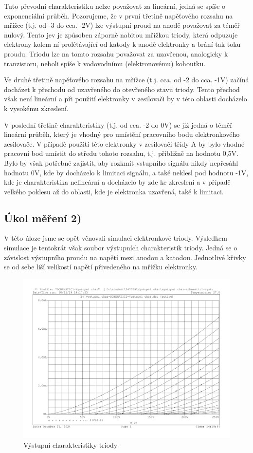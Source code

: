 \documentclass[a4paper, czech]{article}
\begin{document}
Tuto převodní charakteristiku nelze považovat za lineární, jedná se spíše o exponenciální průběh.
Pozorujeme, že v první třetině napěťového rozsahu na mřížce (t.j. od -3 do cca. -2V) lze výstupní proud na anodě považovat za téměř nulový.
Tento jev je způsoben záporně nabitou mřížkou triody, která odpuzuje elektrony kolem ní prolétávající od katody k anodě elektronky a brání tak toku proudu.
Triodu lze na tomto rozsahu považovat za uzavřenou, analogicky k tranzistoru, neboli spíše k vodovodnímu (elektronovému) kohoutku.

Ve druhé třetině napěťového rozsahu na mřížce (t.j. cca. od -2 do cca. -1V) začíná docházet k přechodu od uzavřeného do otevřeného stavu triody.
Tento přechod však není lineární a při použití elektronky v zesilovači by v této oblasti docházelo k vysokému zkreslení.

V poslední třetině charakteristiky (t.j. od cca. -2 do 0V) se již jedná o téměř lineární průběh, který je vhodný pro umístění pracovního bodu elektronkového zesilovače.
V případě použití této elektronky v zesilovači třídy A by bylo vhodné pracovní bod umístit do středu tohoto rozsahu, t.j. přibližně na hodnotu 0,5V.
Bylo by však potřebné zajistit, aby rozkmit vstupního signálu nikdy nepřesáhl hodnotu 0V, kde by docházelo k limitaci signálu, a také neklesl pod hodnotu -1V, kde je charakteristika nelineární a docházelo by zde ke zkreslení a v případě velkého poklesu až do oblasti, kde je elektronka uzavřená, také k limitaci.

\subsection{Úkol měření 2)}

V této úloze jsme se opět věnovali simulaci elektronkové triody.
Výsledkem simulace je tentokrát však soubor výstupních charakteristik triody.
Jedná se o závislost výstupního proudu na napětí mezi anodou a katodou.
Jednotlivé křivky se od sebe liší velikostí napětí přivedeného na mřížku elektronky. 

\begin{figure}[H]
    \centering
    \includegraphics[width=\textwidth]{charakteristiky/uloha2.pdf}
    \caption{Výstupní charakteristiky triody}
\end{figure}
\end{document}
